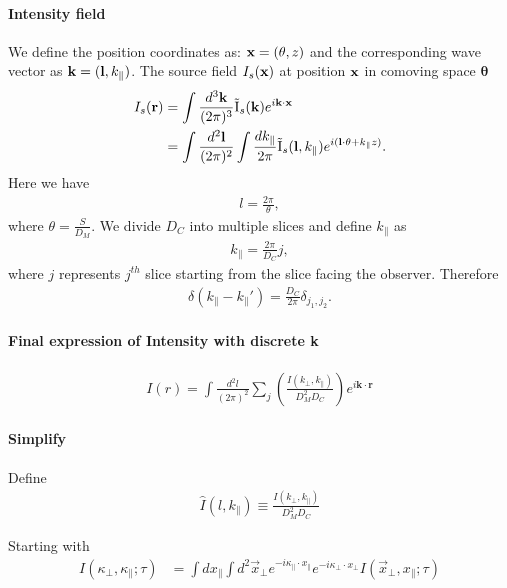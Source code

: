 \documentclass[12pt]{article}
\newcommand{\beq}{\begin{equation}}
\newcommand{\eeq}{\end{equation}}
\newcommand{\beqa}{\begin{eqnarray}}
\newcommand{\eeqa}{\end{eqnarray}}
\newcommand{\beqal}{\begin{aligned}}
\newcommand{\eeqal}{\end{aligned}}
\def\k{{\bf k}}
\def\l{{\bf l}}
\def\x{{\bf x}}
\def\bth{{\mathbf{\theta}}}
\def\il{{\tilde{\rm I}}}
\numberwithin{equation}{section}
\begin{document}
\paragraph{Intensity field}
We define the position coordinates as: $ \x = (\bth, z) $ and the corresponding wave vector as $ \k = (\l, k_\parallel) $. The source field $ I_s(\x) $ at position $ \x $ in comoving space $\mathbf{\theta}$
\beq
\beqal
I_s(\textbf{r}) &= \int \frac{d^3\k}{(2\pi)^3} \il_s (\k) e^{i \k \cdot \x}
\\
&= \int \frac{d^2\l}{(2\pi)^2} \int \frac{dk_{\parallel}}{2\pi} \il_s(\l, k_\parallel) e^{i(\l \cdot \bth + k_\parallel z)}.
\eeqal
\eeq
Here we have
\beqa
l = \frac{2 \pi}{\theta},
\eeqa
where $ \theta  = \frac{S}{D_M}$.  We divide $ D_C $ into multiple slices and define $ k_\parallel $ as 
\begin{eqnarray}
	k_\parallel = \frac{2\pi}{D_C} j,
\end{eqnarray}
where $ j $ represents $ j^{th} $ slice starting from the slice facing the observer. Therefore
\beqa
\delta(k_\parallel - k_\parallel') = \frac{D_C}{2\pi} \delta_{j_1, j_2} .
\eeqa

\paragraph{Final expression of Intensity with discrete \textbf{k}}
\beqa
I(r) = \int\frac{d^2l}{(2\pi)^2} \sum_j \left(\frac{I(k_\perp, k_\parallel)}{D_M^2 D_C} \right) e^{i \textbf{k} \cdot \textbf{r}}
\eeqa

\paragraph{Simplify}
Define
\beqa
\hat{I} (l, k_\parallel) \equiv \frac{I(k_\perp, k_\parallel)}{D_M^2D_C}
\eeqa

Starting with
\beq
\beqal
I(\kappa_\perp,\kappa_\parallel ; \tau) &= \int dx_\parallel \int d^2\vec{x}_\perp e^{-i \kappa_\parallel \cdot x_\parallel} e^{-i \kappa_\perp \cdot x_\perp} I(\vec{x}_\perp, x_\parallel; \tau) \label{eq:foreman1}
\eeqal
\eeq
\end{document}
